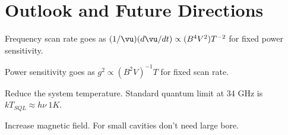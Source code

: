 \documentclass[12pt,twosides]{book}
\begin{document}
\section{Outlook and Future Directions}

Frequency scan rate goes as $(1/\vu)(d\vu/dt) \propto (B^4V^2)T^{-2}$ for fixed power sensitivity.

Power sensitivity goes as $g^2 \propto (B^2V)^{-1}T$ for fixed scan rate.

Reduce the system temperature. Standard quantum limit at 34 GHz is $kT_{SQL} \approx h\nu ~ 1 K$.

Increase magnetic field. For small cavities don't need large bore.
\end{document}
